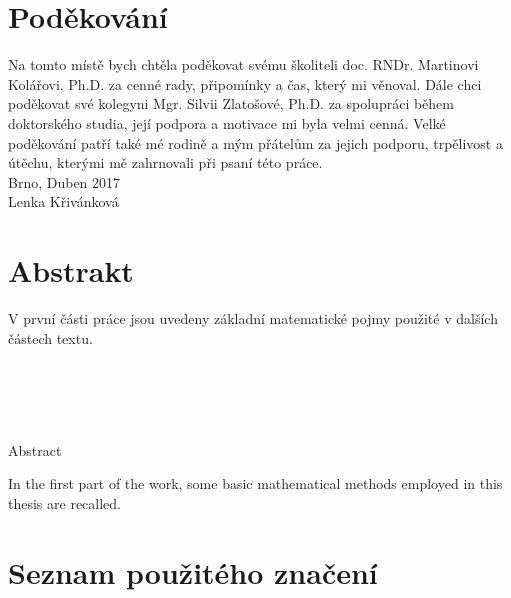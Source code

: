 \documentclass[a4paper,12pt]{report}
\theoremstyle{definition} \newtheorem{definice}[veta]{Definice}
\theoremstyle{remark}
\begin{document}
\chapter*{Poděkování}%
\pagestyle{plain}
Na tomto místě bych chtěla poděkovat svému školiteli doc. RNDr. Martinovi Kolářovi, Ph.D. za cenné rady, připomínky a čas, který mi věnoval.
Dále chci poděkovat své kolegyni Mgr. Silvii Zlatošové, Ph.D. za spolupráci během doktorského studia, její podpora a motivace mi byla velmi cenná.
Velké poděkování patří také mé rodině a mým přátelům za jejich podporu, trpělivost a útěchu, kterými mě zahrnovali při psaní této práce.
\\

Brno, Duben 2017
\\

Lenka Křivánková

\chapter*{Abstrakt}
V první části práce jsou uvedeny základní matematické pojmy použité v dalších částech textu. 
\\\\\\\\\\

\begin{flushright} {{\Huge Abstract}} \vspace{38pt} \end{flushright}
In the first part of the work, some basic mathematical methods employed in this thesis are recalled. 

\tableofcontents {}

\chapter*{Seznam použitého značení} 
\end{document}
